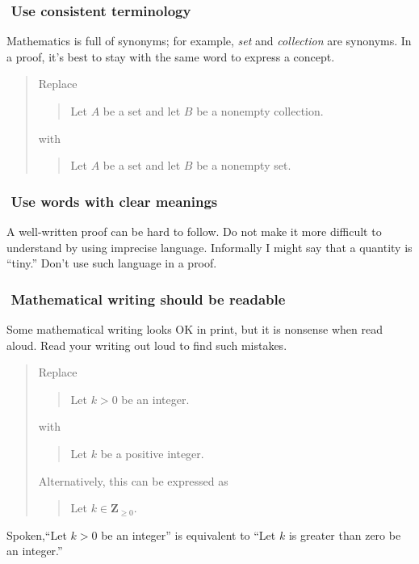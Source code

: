 \documentclass[12pt,fleqn]{article}
\newcounter{ex}\setcounter{ex}{0}
\newcommand{\ex}{%
\hspace{-0.2in} \setcounter{ex}{\value{ex}+1}
\theex \,\,}
\newcounter{se}\setcounter{se}{0}
\begin{document}
\subsubsection*{\ex  Use consistent terminology}

Mathematics is full of synonyms; for example, {\em set\/} and {\em
collection\/} are synonyms. In a proof, it's best to stay with the
same word to express a concept.

\begin{quote}
Replace
\begin{quote}
Let \(A\) be a set and let \(B\) be a nonempty collection.
\end{quote}
with
\begin{quote}
Let \(A\) be a set and let \(B\) be a nonempty set.
\end{quote}
\end{quote}


\subsubsection*{\ex  Use words with clear meanings}

A \mbox{well-written} proof can be hard to follow. Do not make it more
difficult to understand by using imprecise language.  Informally 
I might say that a quantity is ``tiny.'' Don't use such language in a proof.



\subsubsection*{\ex Mathematical writing should be readable}

Some mathematical writing looks OK in print, but it is nonsense when read
aloud.  Read your writing out loud to find such mistakes.

\begin{quote}
Replace
\begin{quote}
  Let \(k > 0\) be an integer.
\end{quote}
with
\begin{quote}
  Let \(k\) be a positive integer.
\end{quote}
Alternatively,  this can be expressed as
\begin{quote}
  Let \(k \in \mathbf{Z}_ {\geq 0}.\)
\end{quote}
\end{quote}
Spoken,``Let \(k > 0\) be an integer'' is equivalent to
``Let \(k\) is greater than zero  be an integer.''
\end{document}
